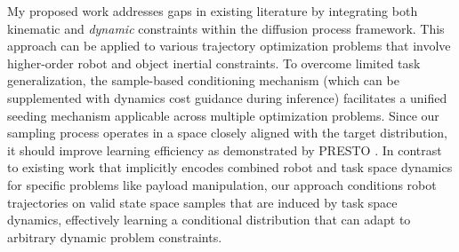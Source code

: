 My proposed work addresses gaps in existing literature by integrating both kinematic and \textsl{dynamic} constraints within the diffusion process framework. This approach can be applied to various trajectory optimization problems that involve higher-order robot and object inertial constraints.
To overcome limited task generalization, the sample-based conditioning mechanism (which can be supplemented with dynamics cost guidance during inference) facilitates a unified seeding mechanism applicable across multiple optimization problems.
Since our sampling process operates in a space closely aligned with the target distribution, it should improve learning efficiency as demonstrated by PRESTO \cite{seo2024presto}.
In contrast to existing work that implicitly encodes combined robot and task space dynamics for specific problems like payload manipulation, our approach conditions robot trajectories on valid state space samples that are induced by task space dynamics, effectively learning a conditional distribution that can adapt to arbitrary dynamic problem constraints.

